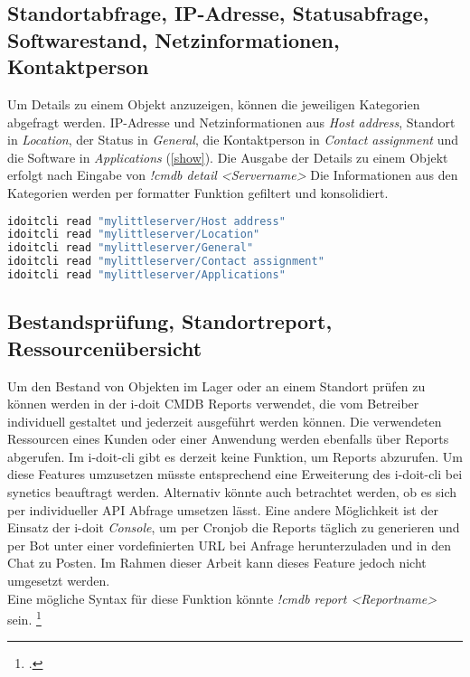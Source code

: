 \subsection{Standortabfrage, IP-Adresse, Statusabfrage, Softwarestand, Netzinformationen, Kontaktperson}
Um Details zu einem Objekt anzuzeigen, können die jeweiligen Kategorien abgefragt werden. IP-Adresse und Netzinformationen aus \textit{Host address}, Standort in \textit{Location}, der Status in \textit{General}, die Kontaktperson in \textit{Contact assignment} und die Software in \textit{Applications} (\autoref{show}). Die Ausgabe der Details zu einem Objekt erfolgt nach Eingabe von \textit{!cmdb detail <Servername>} Die Informationen aus den Kategorien werden per formatter Funktion gefiltert und konsolidiert.

\begin{lstlisting}[language=bash, label=show, caption=Detailansicht eines Objekts mit i-doit-cli]
idoitcli read "mylittleserver/Host address"
idoitcli read "mylittleserver/Location"
idoitcli read "mylittleserver/General"
idoitcli read "mylittleserver/Contact assignment"
idoitcli read "mylittleserver/Applications"
\end{lstlisting}

\subsection{Bestandsprüfung, Standortreport, Ressourcenübersicht}
Um den Bestand von Objekten im Lager oder an einem Standort prüfen zu können werden in der i-doit \acs{CMDB} Reports verwendet, die vom Betreiber individuell gestaltet und jederzeit ausgeführt werden können. Die verwendeten Ressourcen eines Kunden oder einer Anwendung werden ebenfalls über Reports abgerufen.  Im i-doit-cli gibt es derzeit keine Funktion, um Reports abzurufen. Um diese Features umzusetzen müsste entsprechend eine Erweiterung des i-doit-cli bei synetics beauftragt werden. Alternativ könnte auch betrachtet werden, ob es sich per individueller API Abfrage umsetzen lässt. Eine andere Möglichkeit ist der Einsatz der i-doit \textit{Console}, um per Cronjob die Reports täglich zu generieren und per Bot unter einer vordefinierten URL bei Anfrage herunterzuladen und in den Chat zu Posten. Im Rahmen dieser Arbeit kann dieses Feature jedoch nicht umgesetzt werden.\\
Eine mögliche Syntax für diese Funktion könnte \textit{!cmdb report <Reportname>} sein. 
\footcites[Vgl.][o. \pno]{idoit_2019_report}[Vgl.][o. \pno]{idoit_2019_console}

